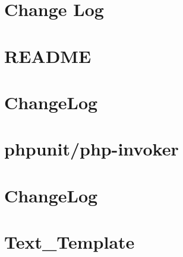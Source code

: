 \documentclass[twoside]{book}
\newcommand{\+}{\discretionary{\mbox{\scriptsize$\hookleftarrow$}}{}{}}
\begin{document}
\chapter{Change Log}
\label{md__c__workspace__proyecto__p_h_p_project_vendor_phpunit_php_file_iterator__change_log}

\chapter{README}
\label{md__c__workspace__proyecto__p_h_p_project_vendor_phpunit_php_file_iterator__r_e_a_d_m_e}

\chapter{Change\+Log}
\label{md__c__workspace__proyecto__p_h_p_project_vendor_phpunit_php_invoker__change_log}

\chapter{phpunit/php-\/invoker}
\label{md__c__workspace__proyecto__p_h_p_project_vendor_phpunit_php_invoker__r_e_a_d_m_e}

\chapter{Change\+Log}
\label{md__c__workspace__proyecto__p_h_p_project_vendor_phpunit_php_text_template__change_log}

\chapter{Text\+\_\+\+Template}
\label{md__c__workspace__proyecto__p_h_p_project_vendor_phpunit_php_text_template__r_e_a_d_m_e}

\end{document}
